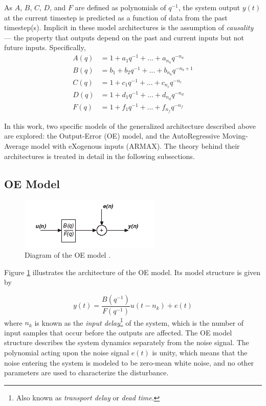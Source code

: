 As $A$, $B$, $C$, $D$, and $F$ are defined as polynomials of $q^{-1}$, the system output $y(t)$ at the current timestep is predicted as a function of data from the past timestep(s). Implicit in these model architectures is the assumption of \emph{causality} — the property that outputs depend on the past and current inputs but not future inputs. Specifically, 
\begin{equation}
    \begin{split}
        A(q) &= 1 + a_1 q^{-1} + ... + a_{n_a} q^{-n_a}\\
        B(q) &= b_1 + b_2 q^{-1} + ... +b_{n_b} q^{-n_b+1}\\
        C(q) &= 1 + c_1 q^{-1} + ... + c_{n_c} q^{-n_c}\\
        D(q) &= 1 + d_1 q^{-1} + ... + d_{n_d} q^{-n_d}\\
        F(q) &= 1 + f_1 q^{-1} + ... + f_{n_f} q^{-n_f}
    \end{split}
\end{equation}

In this work, two specific models of the generalized architecture described above are explored: the Output-Error (OE) model, and the AutoRegressive Moving-Average model with eXogenous inputs (ARMAX). The theory behind their architectures is treated in detail in the following subsections. 

\subsection{OE Model}

\begin{figure}[h]
    \centering
    \includegraphics{figures/oe.png}
    \caption{Diagram of the OE model \cite{ni}.}
    \label{fig:oe}
\end{figure}

Figure \ref{fig:oe} illustrates the architecture of the OE model. Its model structure is given by

\begin{equation}
    \label{eqn:oe}
     y(t) = \frac{B(q^{-1})}{F(q^{-1})} u(t-n_k) + e(t)
\end{equation}
where $n_k$ is known as the \emph{input delay}\footnote{Also known as \emph{transport delay} or \emph{dead time}.} of the system, which is the number of input samples that occur before the outputs are affected. The OE model structure describes the system dynamics separately from the noise signal. The polynomial acting upon the noise signal $e(t)$ is unity, which means that the noise entering the system is modeled to be zero-mean white noise, and no other parameters are used to characterize the disturbance. 

